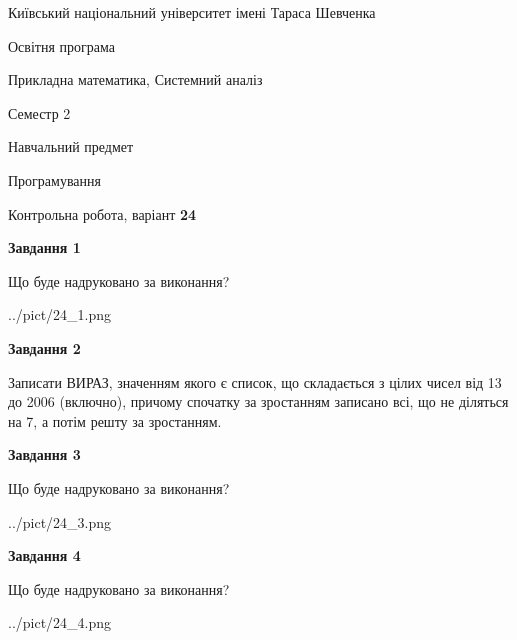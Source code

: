\documentclass[12pt, ukrainian]{article}
\begin{document}
{{\begin {small}\par
{ \center  Київський національний університет імені Тараса Шевченка \par}
{\parbox {5 cm}{Освітня програма \hfill}{\parbox {8 cm}{Прикладна математика, Системний аналіз \hfill}}\parbox {5 cm}{\hfill Семестр 2}}\par
{\parbox {5 cm} {Навчальний предмет \hfill}\parbox {7 cm}{Програмування \hfill}\parbox {6cm}{\hfill}\par}\vspace{-7pt} \end{small}}{\center Контрольна робота, варіант  \No \textbf
{ 24 }\par}}
{
\begin {large}
{\begin {center}\textbf{Завдання 1}\end {center}}\par
Що буде надруковано за виконання?\par\par
\begin{center}
	{../pict/24_1.png}
\end{center}
\newpage

{\begin {center}\textbf{Завдання 2}\end {center}}\par

Записати ВИРАЗ, значенням якого є список, що складається з цілих чисел від 13 до 2006 (включно), причому спочатку за зростанням записано всі, що не діляться на 7, а потім решту за зростанням.\par
\newpage

{\begin {center}\textbf{Завдання 3}\end {center}}\par
Що буде надруковано за виконання?\par
\begin{center}
	{../pict/24_3.png}
\end{center}
\newpage

{\begin {center}\textbf{Завдання 4}\end {center}}\par
Що буде надруковано за виконання?\par
\begin{center}
	{../pict/24_4.png}
\end{center}
\newpage


\end{large}}
\end{document}
